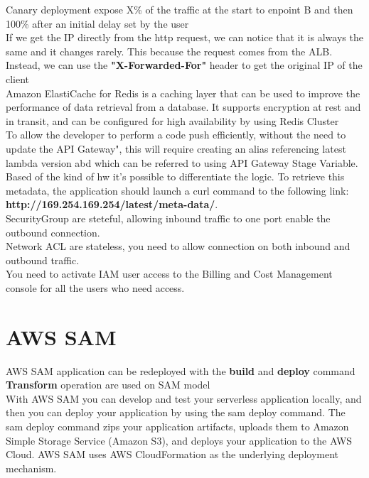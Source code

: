 \documentclass[12pt, letterpaper, twoside]{article}
\begin{document}
Canary deployment expose X\% of the traffic at the start to enpoint B and then 100\% after an initial
delay set by the user\\

If we get the IP directly from the http request, we can notice that it is always the same and it 
changes rarely. This because the request comes from the ALB. Instead, we can use the \textbf{"X-Forwarded-For"} 
header to get the original IP of the client\\

Amazon ElastiCache for Redis is a caching layer that can be used to improve the performance of data 
retrieval from a database. It supports encryption at rest and in transit, and can be configured for 
high availability by using Redis Cluster\\

To allow the developer to perform a code push efficiently, without the need to update the API Gateway",
this will require creating an alias referencing latest lambda version abd which can be referred to 
using API Gateway Stage Variable.\\

Based of the kind of hw it's possible to differentiate the logic. To retrieve this metadata, the 
application should launch a curl command to the following link: \textbf{http://169.254.169.254/latest/meta-data/}.\\

SecurityGroup are steteful, allowing inbound traffic to one port enable the outbound connection.\\
Network ACL are stateless, you need to allow connection on both inbound and outbound traffic.\\

You need to activate IAM user access to the Billing and Cost Management console for all the users who need access.\\


\section{AWS SAM}
AWS SAM application can be redeployed with the \textbf{build} and \textbf{deploy} command\\
\textbf{Transform} operation are used on SAM model\\

With AWS SAM you can develop and test your serverless application locally, and then you can deploy your application
by using the sam deploy command. The sam deploy command zips your application artifacts, uploads them to Amazon 
Simple Storage Service (Amazon S3), and deploys your application to the AWS Cloud. AWS SAM uses AWS CloudFormation 
as the underlying deployment mechanism.
\end{document}
